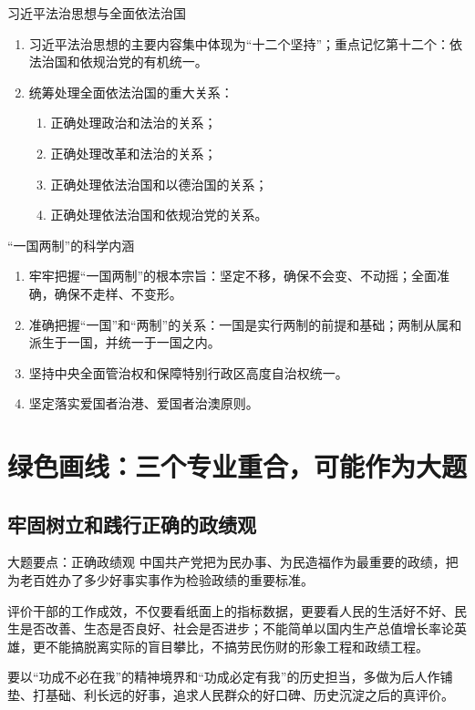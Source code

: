 \documentclass[12pt,a4paper]{ctexart}
\begin{document}
\begin{yellowbox}{习近平法治思想与全面依法治国}
\begin{enumerate}
  \item 习近平法治思想的主要内容集中体现为“十二个坚持”；重点记忆第十二个：依法治国和依规治党的有机统一。
  \item 统筹处理全面依法治国的重大关系：
  \begin{enumerate}
    \item 正确处理政治和法治的关系；
    \item 正确处理改革和法治的关系；
    \item 正确处理依法治国和以德治国的关系；
    \item 正确处理依法治国和依规治党的关系。
  \end{enumerate}
\end{enumerate}
\end{yellowbox}



\begin{yellowbox}{“一国两制”的科学内涵}
\begin{enumerate}
  \item 牢牢把握“一国两制”的根本宗旨：坚定不移，确保不会变、不动摇；全面准确，确保不走样、不变形。
  \item 准确把握“一国”和“两制”的关系：一国是实行两制的前提和基础；两制从属和派生于一国，并统一于一国之内。
  \item 坚持中央全面管治权和保障特别行政区高度自治权统一。
  \item 坚定落实爱国者治港、爱国者治澳原则。
\end{enumerate}
\end{yellowbox}


\section{绿色画线：三个专业重合，可能作为大题}

\subsection{牢固树立和践行正确的政绩观}

\begin{greenlinebox}{大题要点：正确政绩观}
中国共产党把为民办事、为民造福作为最重要的政绩，把为老百姓办了多少好事实事作为检验政绩的重要标准。

评价干部的工作成效，不仅要看纸面上的指标数据，更要看人民的生活好不好、民生是否改善、生态是否良好、社会是否进步；不能简单以国内生产总值增长率论英雄，更不能搞脱离实际的盲目攀比，不搞劳民伤财的形象工程和政绩工程。

要以“功成不必在我”的精神境界和“功成必定有我”的历史担当，多做为后人作铺垫、打基础、利长远的好事，追求人民群众的好口碑、历史沉淀之后的真评价。
\end{greenlinebox}
\end{document}
